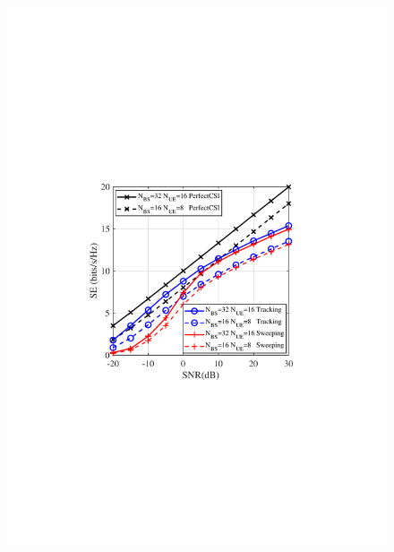 \documentclass[journal,12pt,onecolumn,draftclsnofoot,]{IEEEtran}
\begin{document}
\begin{figure}
{\hspace{-0mm}\includegraphics[scale=0.46]{6-3.pdf}\hspace{-0mm}
}
\quad
\subfloat[]{
}
\end{figure}
\end{document}
